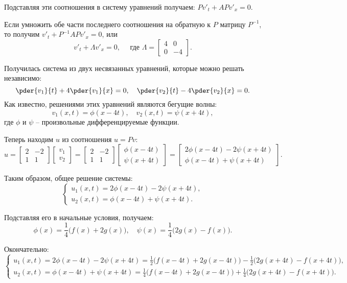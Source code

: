 Подставляя эти соотношения в систему уравнений получаем: \( Pv'_t + APv'_x = 0 \).

Если умножить обе части последнего соотношения на обратную к \( P \) матрицу
\( P^{-1} \), то получим \( v'_t + P^{-1}APv'_x = 0 \), или
\[
    v'_t + \Lambda v'_x = 0,\quad \text{ где }
    \Lambda = \begin{bmatrix} 4 & 0 \\[-.5em] 0 & -4 \end{bmatrix}.
\]

Получилась система из двух несвязанных уравнений, которые можно решать
независимо:
\[
    \pder{v_1}{t} + 4\pder{v_1}{x} = 0,\quad \pder{v_2}{t} - 4\pder{v_2}{x} = 0.
\]
Как известно, решениями этих уравнений являются бегущие волны:
\[
    v_1(x, t) = \phi(x - 4t),\quad v_2(x, t) = \psi(x + 4t),
\]
где \( \phi \) и \( \psi \) -- произвольные дифференцируемые функции.

Теперь находим \( u \) из соотношения \( u = Pv \):
\[
    u = \begin{bmatrix} 2 & -2 \\[-.5em] 1 & 1 \end{bmatrix}
    \begin{bmatrix} v_1 \\[-.5em] v_2 \end{bmatrix} =
    \begin{bmatrix} 2 & -2 \\[-.5em] 1 & 1 \end{bmatrix}
    \begin{bmatrix} \phi(x - 4t) \\[-.5em] \psi(x + 4t) \end{bmatrix} =
    \begin{bmatrix} 2\phi(x-4t) - 2\psi(x+4t) \\[-.5em]
    \phi(x-4t) + \psi(x+4t) \end{bmatrix}.
\]

Таким образом, общее решение системы:
\[
    \left\{
    \begin{array}{l}
        u_1(x, t) = 2\phi(x-4t) - 2\psi(x+4t), \\
        u_2(x, t) = \phi(x-4t) + \psi(x+4t).
    \end{array}
    \right.
\]

Подставляя его в начальные условия, получаем:
\[
    \phi(x) = \frac{1}{4}\bigl(f(x) + 2g(x)\bigr), \quad
    \psi(x) = \frac{1}{4}\bigl(2g(x) - f(x)\bigr).
\]

Окончательно:
\[
    \left\{
    \begin{array}{l}
    u_1(x, t) = 2\phi(x-4t) - 2\psi(x+4t) = \frac{1}{2}\bigl(f(x-4t) + 2g(x-4t)
    \bigr) - \frac{1}{2}\bigl(2g(x+4t) - f(x+4t)\bigr), \\
    u_2(x, t) = \phi(x-4t) + \psi(x+4t) = \frac{1}{4}\bigl(f(x-4t) + 2g(x-4t)
    \bigr) + \frac{1}{4}\bigl(2g(x+4t) - f(x+4t)\bigr).
    \end{array}
    \right.
\]

\newpage
